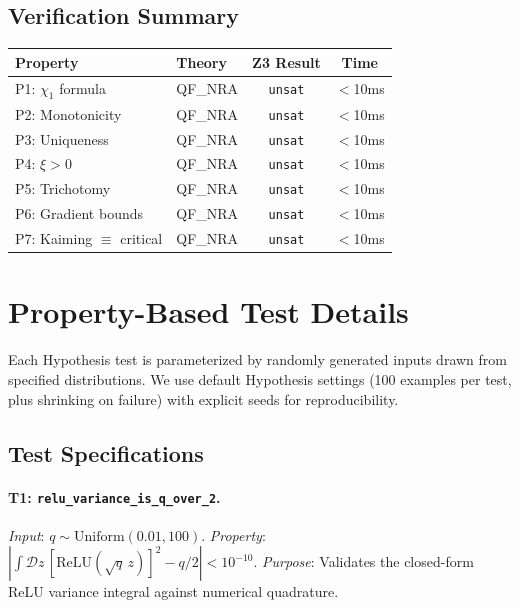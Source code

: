 \documentclass[10pt]{article}
\begin{document}
\subsection{Verification Summary}

\begin{table}[h]
\centering
\small
\begin{tabular}{@{}llcc@{}}
\toprule
\textbf{Property} & \textbf{Theory} & \textbf{Z3 Result} & \textbf{Time} \\
\midrule
P1: $\chi_1$ formula & QF\_NRA & \texttt{unsat} & $<$10ms \\
P2: Monotonicity & QF\_NRA & \texttt{unsat} & $<$10ms \\
P3: Uniqueness & QF\_NRA & \texttt{unsat} & $<$10ms \\
P4: $\xi > 0$ & QF\_NRA & \texttt{unsat} & $<$10ms \\
P5: Trichotomy & QF\_NRA & \texttt{unsat} & $<$10ms \\
P6: Gradient bounds & QF\_NRA & \texttt{unsat} & $<$10ms \\
P7: Kaiming $\equiv$ critical & QF\_NRA & \texttt{unsat} & $<$10ms \\
\bottomrule
\end{tabular}
\end{table}


\section{Property-Based Test Details}
\label{app:hypothesis}

Each Hypothesis test is parameterized by randomly generated inputs drawn from specified distributions.
We use default Hypothesis settings (100 examples per test, plus shrinking on failure) with explicit seeds for reproducibility.

\subsection{Test Specifications}

\paragraph{T1: \texttt{relu\_variance\_is\_q\_over\_2}.}
\emph{Input}: $q \sim \text{Uniform}(0.01, 100)$.
\emph{Property}: $\left|\int \mathcal{D}z\, [\text{ReLU}(\sqrt{q}\, z)]^2 - q/2\right| < 10^{-10}$.
\emph{Purpose}: Validates the closed-form ReLU variance integral against numerical quadrature.
\end{document}
